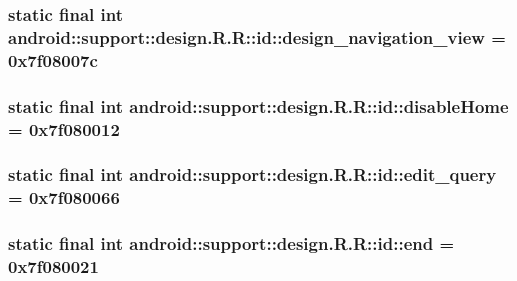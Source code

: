 \hypertarget{classandroid_1_1support_1_1design_1_1_r_1_1id_c167f43eaf75e75007cdc12c236135a6}{
\subsubsection[{design\_\-navigation\_\-view}]{\setlength{\rightskip}{0pt plus 5cm}static final int android::support::design.R.R::id::design\_\-navigation\_\-view = 0x7f08007c}}
\label{classandroid_1_1support_1_1design_1_1_r_1_1id_c167f43eaf75e75007cdc12c236135a6}


\hypertarget{classandroid_1_1support_1_1design_1_1_r_1_1id_e2fcd3e488d07e62bfa54ca80d1253a3}{
\subsubsection[{disableHome}]{\setlength{\rightskip}{0pt plus 5cm}static final int android::support::design.R.R::id::disableHome = 0x7f080012}}
\label{classandroid_1_1support_1_1design_1_1_r_1_1id_e2fcd3e488d07e62bfa54ca80d1253a3}


\hypertarget{classandroid_1_1support_1_1design_1_1_r_1_1id_5ceb2219e9f0efcb5630ee54789aca96}{
\subsubsection[{edit\_\-query}]{\setlength{\rightskip}{0pt plus 5cm}static final int android::support::design.R.R::id::edit\_\-query = 0x7f080066}}
\label{classandroid_1_1support_1_1design_1_1_r_1_1id_5ceb2219e9f0efcb5630ee54789aca96}


\hypertarget{classandroid_1_1support_1_1design_1_1_r_1_1id_9f33b50f0432b0647d26c8746abcaf3f}{
\subsubsection[{end}]{\setlength{\rightskip}{0pt plus 5cm}static final int android::support::design.R.R::id::end = 0x7f080021}}
\label{classandroid_1_1support_1_1design_1_1_r_1_1id_9f33b50f0432b0647d26c8746abcaf3f}


